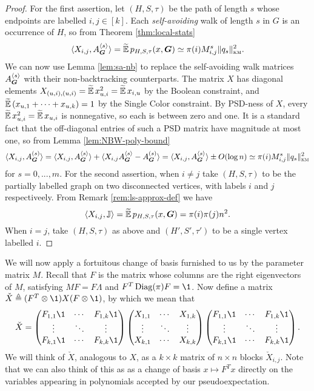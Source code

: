 \begin{proof}
    For the first assertion, let $(H,S,\tau)$ be the path of length $s$ whose endpoints are labelled $i,j\in[k]$. Each \textit{self-avoiding} walk of length $s$ in $G$ is an occurrence of $H$, so from Theorem \ref{thm:local-stats}
    $$
        \langle X_{i,j},A^{\langle s \rangle}_{\boldsymbol{G}}\rangle = \widetilde{\operatorname*{\mathbb{E}}}\, p_{H,S,\tau}(x,\boldsymbol{G}) \simeq \pi(i)M_{i,j}^s \|q_s\|^2_{\textsc{km}}.
    $$
    We can now use Lemma \ref{lem:sa-nb} to replace the self-avoiding walk matrices $A^{\langle s \rangle}_{\boldsymbol{G}}$ with their non-backtracking counterparts. The matrix $X$ has diagonal elements $X_{(u,i),(u,i)} = \widetilde{\operatorname*{\mathbb{E}}}\, x_{u,i}^2 = \widetilde{\operatorname*{\mathbb{E}}}\, x_{i,u}$ by the Boolean constraint, and $\widetilde{\operatorname*{\mathbb{E}}}\, (x_{u,1} + \cdots + x_{u,k}) = 1$ by the Single Color constraint. By PSD-ness of $X$, every $\widetilde{\operatorname*{\mathbb{E}}}\, x_{u,i}^2 = \widetilde{\operatorname*{\mathbb{E}}}\, x_{u,i}$ is nonnegative, so each is between zero and one. It is a standard fact that the off-diagonal entries of such a PSD matrix have magnitude at most one, so from Lemma \ref{lem:NBW-poly-bound}
    $$
        \langle X_{i,j}, A^{(s)}_{\boldsymbol{G}} \rangle = \langle X_{i,j}, A^{\langle s \rangle}_{\boldsymbol{G}} \rangle + \langle X_{i,j} A^{\langle s \rangle}_{\boldsymbol{G}} - A^{(s)}_{\boldsymbol{G}}\rangle = \langle X_{i,j}, A^{\langle s \rangle}_{\boldsymbol{G}} \rangle \pm O(\log n) \simeq \pi(i)M^s_{i,j} \|q_s\|^2_{\textsc{km}}
    $$
    for $s = 0,...,m$. For the second assertion, when $i\neq j$ take $(H,S,\tau)$ to be the partially labelled graph on two disconnected vertices, with labels $i$ and $j$ respectiveely. From Remark \ref{rem:ls-approx-def} we have
    $$
        \langle X_{i,j},\mathbb{J} \rangle = \widetilde{\operatorname*{\mathbb{E}}}\, p_{H,S,\tau}(x,\boldsymbol{G}) = \pi(i)\pi(j)n^2.
    $$
    When $i=j$, take $(H,S,\tau)$ as above and $(H',S',\tau')$ to be a single vertex labelled $i$.
\end{proof}

We will now apply a fortuitous change of basis furnished to us by the parameter matrix $M$. Recall that $F$ is the matrix whose columns are the right eigenvectors of $M$, satisfying $MF = F\Lambda$ and $F^T\Diag(\pi)F = \1$. Now define a matrix $\check X \triangleq (F^T \otimes \1) X (F\otimes \1)$, by which we mean that 
$$
    \check X = \begin{pmatrix} F_{1,1}\1 & \cdots & F_{1,k}\1 \\
    \vdots & \ddots & \vdots \\
    F_{k,1}\1 & \cdots & F_{k,k}\1 
    \end{pmatrix} 
    \begin{pmatrix} X_{1,1} & \cdots & X_{1,k} \\
    \vdots & \ddots & \vdots \\
    X_{k,1} & \cdots & X_{k,k} 
    \end{pmatrix}
    \begin{pmatrix} F_{1,1}\1 & \cdots & F_{1,k}\1 \\
    \vdots & \ddots & \vdots \\
    F_{k,1}\1 & \cdots & F_{k,k}\1 
    \end{pmatrix}.
$$
We will think of $\check X$, analogous to $X$, as a $k\times k$ matrix of $n\times n$ blocks $\check X_{i,j}$. Note that we can also think of this as as a change of basis $x \mapsto F^T x$ directly on the variables appearing in polynomials accepted by our pseudoexpectation.

